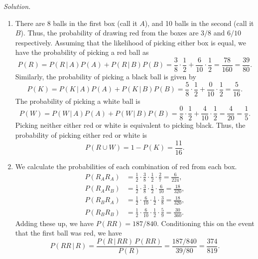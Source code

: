 \documentclass[10pt]{article}
\begin{document}
        \textit{Solution.}
        \begin{enumerate}
                \item There are 8 balls in the first box (call it $A$), and 10 balls in the second (call it $B$).
                Thus, the probability of drawing red from the boxes are $3 /8$ and $6 /10$ respectively.
                Assuming that the likelihood of picking either box is equal, we have the probability of picking a red ball as
                \[
                        P(R) = P(R \,|\, A)P(A) + P(R \,|\, B)P(B) = 
                                \frac{3}{8}\cdot \frac{1}{2} + \frac{6}{10}\cdot \frac{1}{2} = \frac{78}{160} = \frac{39}{80}.
                \]
                Similarly, the probability of picking a black ball is given by
                \[
                        P(K) = P(K \,|\, A)P(A) + P(K \,|\, B)P(B) = 
                                \frac{5}{8}\cdot \frac{1}{2} + \frac{0}{10}\cdot \frac{1}{2} = \frac{5}{16}.
                \]
                The probability of picking a white ball is
                \[
                        P(W) = P(W \,|\, A)P(A) + P(W \,|\, B)P(B) = 
                                \frac{0}{8}\cdot \frac{1}{2} + \frac{4}{10}\cdot \frac{1}{2} = \frac{4}{20} = \frac{1}{5}.
                \]
                Picking neither either red or white is equivalent to picking black. Thus, the probability of picking either red or white is
                \[
                        P(R \cup W) = 1 - P(K) = \frac{11}{16}.
                \]

                \item We calculate the probabilities of each combination of red from each box.
                \begin{align*}
                        P(R_AR_A) &= \frac{1}{2}\cdot \frac{3}{8}\cdot \frac{1}{2}\cdot \frac{2}{7} = \frac{6}{224}, \\
                        P(R_AR_B) &= \frac{1}{2}\cdot \frac{3}{8}\cdot \frac{1}{2}\cdot \frac{6}{10} = \frac{18}{320}, \\
                        P(R_BR_A) &= \frac{1}{2}\cdot \frac{6}{10}\cdot \frac{1}{2}\cdot \frac{3}{8} = \frac{18}{320}, \\
                        P(R_BR_B) &= \frac{1}{2}\cdot \frac{6}{10}\cdot \frac{1}{2}\cdot \frac{5}{9} = \frac{30}{360}. 
                \end{align*}
                Adding these up, we have $P(RR) = 187 / 840$. Conditioning this on the event that the first ball was red, we have
                \[
                        P(RR \,|\, R) = \frac{P(R \,|\, RR) \, P(RR)}{P(R)} = \frac{187 /840}{39 /80} = \frac{374}{819}.
                \]


\end{enumerate}
\end{document}
